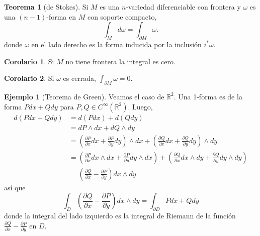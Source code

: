 \documentclass[spanish]{article}
\theoremstyle{definition}
\newtheorem*{teo}{Teorema}
\newtheorem*{coro}{Corolario}
\newtheorem*{ejem}{Ejemplo}
\newcommand{\R}{\mathbb{R}}
\newcommand{\Cinf}{C^\infty}
\begin{document}
	\begin{teo}[de Stokes]
		Si $M$ es una $n$-variedad diferenciable con frontera y $\omega$ es una $(n-1)$-forma en $M$ con soporte compacto,
		\[\int_{M}d\omega=\int_{\partial M}\omega.\]
		donde $\omega$ en el lado derecho es la forma inducida por la inclusión $i^*\omega$.
	\end{teo}
	\begin{coro}
		Si $M$ no tiene frontera la integral es cero.
	\end{coro}
	\begin{coro}
		Si $\omega$ es cerrada, $\int_{\partial M}\omega=0$.
	\end{coro}
	
	\begin{ejem}[Teorema de Green]
		Veamos el caso de $\R^2$. Una 1-forma es de la forma $Pdx+Qdy$ para $P,Q\in\Cinf(\R^2)$. Luego,
		\begin{align*}
			d(Pdx+Qdy)&=d(Pdx)+d(Qdy)\\
			&=dP\wedge dx+dQ\wedge dy\\
			&=\left(\frac{\partial P}{\partial x}dx+\frac{\partial P}{\partial y}dy\right)\wedge dx+\left(\frac{\partial Q}{\partial x}dx+\frac{\partial Q}{\partial y}dy\right)\wedge dy\\
			&=\left(\frac{\partial P}{\partial x}dx\wedge dx+\frac{\partial P}{\partial y}dy\wedge dx\right)+\left(\frac{\partial Q}{\partial x}dx\wedge dy+\frac{\partial Q}{\partial y}dy\wedge dy\right)\\
			&=\left(\frac{\partial Q}{\partial x}-\frac{\partial P}{\partial y}\right)dx\wedge dy
		\end{align*}
		así que
		\[\int_{D}\left(\frac{\partial Q}{\partial x}-\frac{\partial P}{\partial y}\right)dx\wedge dy=\int_{\partial D}Pdx+Qdy\]
		donde la integral del lado izquierdo es la integral de Riemann de la función $\frac{\partial Q}{\partial x}-\frac{\partial P}{\partial y}$ en $D$.
	\end{ejem}
\end{document}
